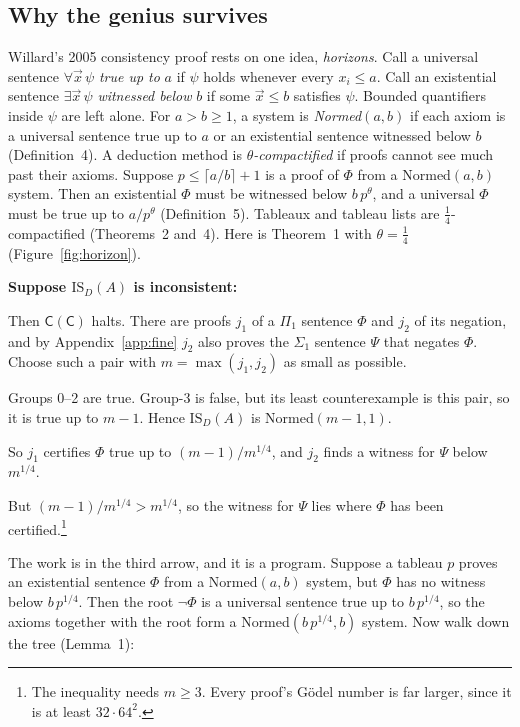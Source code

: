\documentclass[11pt]{article}
\newcommand{\Prog}[1]{\mathsf{#1}}
\newcommand{\contra}{~\text{\Lightning}}  %
\newcommand{\ISD}{\mathrm{IS}_D(A)}
\newcommand{\Case}[1]{\par\smallskip\noindent\hspace*{1em}\textbf{#1}\par}
\theoremstyle{plain}
\theoremstyle{definition}
\begin{document}
\subsection*{Why the genius survives}

Willard's 2005 consistency proof rests on one idea, \emph{horizons}. Call a
universal sentence $\forall\vec x\,\psi$ \emph{true up to} $a$ if $\psi$
holds whenever every $x_i \le a$. Call an existential sentence
$\exists\vec x\,\psi$ \emph{witnessed below} $b$ if some $\vec x \le b$
satisfies $\psi$. Bounded quantifiers inside $\psi$ are left alone. For
$a > b \ge 1$, a system is \emph{Normed}$(a,b)$ if each axiom is a universal
sentence true up to $a$ or an existential sentence witnessed below $b$
(Definition~4). A deduction method is \emph{$\theta$-compactified} if proofs
cannot see much past their axioms. Suppose $p \le \lceil a/b\rceil + 1$ is a
proof of $\Phi$ from a Normed$(a,b)$ system. Then an existential $\Phi$ must be
witnessed below $b\,p^\theta$, and a universal $\Phi$ must be true up to
$a/p^\theta$ (Definition~5). Tableaux and tableau lists are
$\tfrac14$-compactified (Theorems~2 and~4). Here is Theorem~1 with
$\theta = \tfrac14$ (Figure~\ref{fig:horizon}).

\Case{Suppose $\ISD$ is inconsistent:}
\begin{steps}
\item Then $\Prog{C}(\Prog{C})$ halts. There are proofs $j_1$ of a $\Pi_1$
  sentence $\Phi$ and $j_2$ of its negation, and by Appendix~\ref{app:fine}
  $j_2$ also proves the $\Sigma_1$ sentence $\Psi$ that negates $\Phi$.
  Choose such a pair with $m = \max(j_1, j_2)$ as small as possible.
\item Groups 0--2 are true. Group-3 is false, but its least counterexample is
  this pair, so it is true up to $m - 1$. Hence $\ISD$ is
  Normed$(m-1, 1)$.
\item So $j_1$ certifies $\Phi$ true up to $(m-1)/m^{1/4}$, and $j_2$ finds a
  witness for $\Psi$ below $m^{1/4}$.
\item But $(m-1)/m^{1/4} > m^{1/4}$, so the witness for $\Psi$ lies where
  $\Phi$ has been certified.\footnote{The inequality needs $m \ge 3$. Every
  proof's Gödel number is far larger, since it is at least $32 \cdot
  64^2$.}\contra
\end{steps}

\noindent
The work is in the third arrow, and it is a program. Suppose a tableau $p$
proves an existential sentence $\Phi$ from a Normed$(a,b)$ system, but $\Phi$
has no witness below $b\,p^{1/4}$. Then the root $\neg\Phi$ is a universal
sentence true up to $b\,p^{1/4}$, so the axioms together with the root form a
Normed$(b\,p^{1/4}, b)$ system. Now walk down the tree (Lemma~1):
\end{document}
